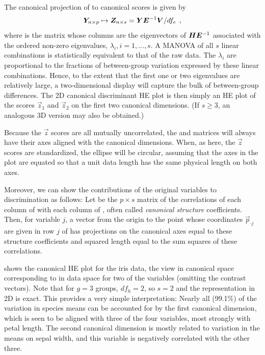 The canonical projection of   to canonical scores  is given by
\begin{equation}
\bm{Y}_{n \times p} \mapsto \bm{Z}_{n \times s} = \bm{Y} \bm{\bm{E}}^{-1} \bm{V} / df_e \:\: ,
\end{equation}
where  is the matrix whose columns are the eigenvectors of $\bm{H} \bm{\bm{E}}^{-1}$
associated with the ordered non-zero eigenvalues, \(\lambda_i, i=1,\dots, s\).
A MANOVA of all $s$ linear combinations is statistically
equivalent to that of the raw data.
The \(\lambda_i\)
are proportional to the fractions of between-group variation
expressed by these linear combinations.
Hence, to the extent that the first one or two
eigenvalues are relatively large, a two-dimensional display will
capture the bulk of between-group differences. The 2D canonical
discriminant HE plot is then simply an HE plot of the scores
$\vec{z}_1$ and $\vec{z}_2$ on the first two canonical dimensions.
(If $s\ge3$, an analogous 3D version may also be obtained.)

Because the $\vec{z}$ scores are all mutually uncorrelated, the  and
 matrices will always have their axes aligned with the
canonical dimensions. When, as here, the $\vec{z}$ scores are
standardized, the  ellipse will be circular, assuming that
the axes in the plot are equated so that a unit data length has the same
physical length on both axes.

Moreover, we can show the contributions of the original variables to discrimination
as follows:  Let  be the $p \times s$ matrix of the correlations of
each column of  with each column of , often called
\emph{canonical structure} coefficients.
Then, for variable $j$, a
vector from the origin
to the point whose coordinates $\vec{p}_{\cdot j}$ are given in row $j$ of 
has projections on the canonical axes equal to these structure coefficients
and squared length equal to the sum squares of these correlations.

 shows the canonical HE plot for the iris data, the
view in canonical space corresponding to  in data space
for two of the variables (omitting the contrast vectors).
Note that for $g=3$ groups, $df_h=2$, so $s=2$ and the representation in 2D is exact.
This provides a very simple interpretation:  Nearly all (99.1\%)
of the variation in species means can be accounted for by the first canonical dimension,
which is seen to be aligned with three of the four variables, most strongly with
petal length.  The second canonical dimension is mostly related to variation in the
means on sepal width, and this variable is negatively correlated with the
other three.

